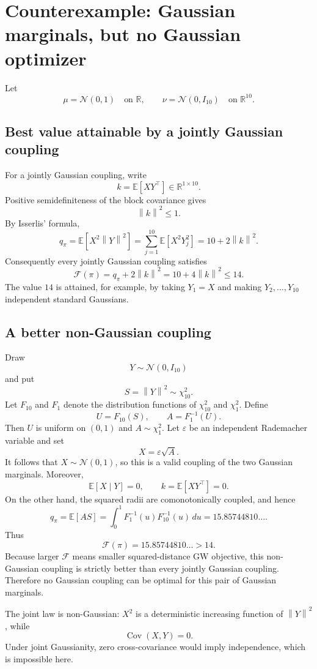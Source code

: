 \documentclass[11pt]{article}
\newcommand{\R}{\mathbb{R}}
\newcommand{\E}{\mathbb{E}}
\newcommand{\cF}{\mathcal{F}}
\newcommand{\norm}[1]{\left\lVert #1\right\rVert}
\newcommand{\Cov}{\operatorname{Cov}}
\begin{document}
\section{Counterexample: Gaussian marginals, but no Gaussian optimizer}

Let
\[
\mu=\mathcal N(0,1)
\quad\text{on }\R,
\qquad
\nu=\mathcal N(0,I_{10})
\quad\text{on }\R^{10}.
\]

\subsection{Best value attainable by a jointly Gaussian coupling}

For a jointly Gaussian coupling, write
\[
k=\E[XY^\top]\in\R^{1\times10}.
\]
Positive semidefiniteness of the block covariance gives
\[
\norm{k}^2\leq1.
\]
By Isserlis' formula,
\[
q_\pi
=
\E[X^2\norm{Y}^2]
=
\sum_{j=1}^{10}\E[X^2Y_j^2]
=
10+2\norm{k}^2.
\]
Consequently every jointly Gaussian coupling satisfies
\[
\cF(\pi)
=
q_\pi+2\norm{k}^2
=
10+4\norm{k}^2
\leq14.
\]
The value $14$ is attained, for example, by taking $Y_1=X$ and making
$Y_2,\ldots,Y_{10}$ independent standard Gaussians.

\subsection{A better non-Gaussian coupling}

Draw
\[
Y\sim\mathcal N(0,I_{10})
\]
and put
\[
S=\norm{Y}^2\sim\chi^2_{10}.
\]
Let $F_{10}$ and $F_1$ denote the distribution functions of
$\chi^2_{10}$ and $\chi^2_1$. Define
\[
U=F_{10}(S),
\qquad
A=F_1^{-1}(U).
\]
Then $U$ is uniform on $(0,1)$ and $A\sim\chi^2_1$. Let $\varepsilon$ be an
independent Rademacher variable and set
\[
X=\varepsilon\sqrt{A}.
\]
It follows that $X\sim\mathcal N(0,1)$, so this is a valid coupling of the
two Gaussian marginals. Moreover,
\[
\E[X\mid Y]=0,
\qquad
k=\E[XY^\top]=0.
\]
On the other hand, the squared radii are comonotonically coupled, and hence
\[
q_\pi
=
\E[AS]
=
\int_0^1
F_1^{-1}(u)F_{10}^{-1}(u)\,du
=
15.85744810\ldots.
\]
Thus
\[
\cF(\pi)=15.85744810\ldots>14.
\]
Because larger $\cF$ means smaller squared-distance GW objective, this
non-Gaussian coupling is strictly better than every jointly Gaussian
coupling. Therefore no Gaussian coupling can be optimal for this pair of
Gaussian marginals.

The joint law is non-Gaussian: $X^2$ is a deterministic increasing function
of $\norm{Y}^2$, while
\[
\Cov(X,Y)=0.
\]
Under joint Gaussianity, zero cross-covariance would imply independence,
which is impossible here.
\end{document}
